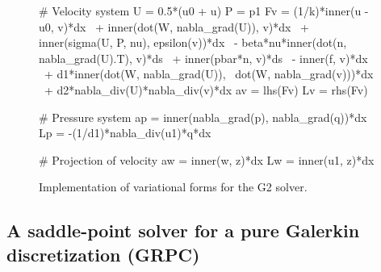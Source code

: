 \begin{figure}
\bwfig
\begin{python}
# Velocity system
U = 0.5*(u0 + u)
P = p1
Fv = (1/k)*inner(u - u0, v)*dx \
   + inner(dot(W, nabla_grad(U)), v)*dx \
   + inner(sigma(U, P, nu), epsilon(v))*dx \
   - beta*nu*inner(dot(n, nabla_grad(U).T), v)*ds \
   + inner(pbar*n, v)*ds \
   - inner(f, v)*dx \
   + d1*inner(dot(W, nabla_grad(U)), \
              dot(W, nabla_grad(v)))*dx \
   + d2*nabla_div(U)*nabla_div(v)*dx
av = lhs(Fv)
Lv = rhs(Fv)

# Pressure system
ap = inner(nabla_grad(p), nabla_grad(q))*dx
Lp = -(1/d1)*nabla_div(u1)*q*dx

# Projection of velocity
aw = inner(w, z)*dx
Lw = inner(u1, z)*dx
\end{python}
\caption{Implementation of variational forms for the G2 solver.}
\label{fig:g2_code}
\end{figure}

\subsection{A saddle-point solver for a pure Galerkin discretization (GRPC)}

